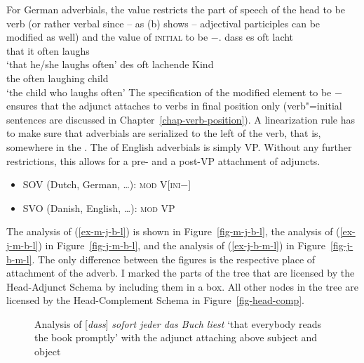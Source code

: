For German adverbials, the value restricts the part of speech of the head to be verb (or rather
verbal since -- as (b) shows -- adjectival participles can be modified as
well) and the value of \textsc{initial} to be $-$. 
\eal
\ex
\gll dass es oft lacht\\
     that it often laughs\\\german
\glt `that he/she laughs often'
\ex 
\gll des oft lachende Kind\\
     the often laughing child\\
\glt `the child who laughs often'
\zl
The specification of the modified element to be \initial$-$ ensures that the adjunct attaches to
verbs in final position only (verb"=initial sentences are discussed in
Chapter~\ref{chap-verb-position}). A linearization rule has to make sure that adverbials are
serialized to the left of the verb, that is, somewhere in the \mf. The \modv of English adverbials
is simply VP. Without any further restrictions, this allows for a pre- and a post-VP attachment of
adjuncts.
\begin{itemize}
\item SOV (Dutch, German, \ldots): \textsc{mod} V[\textsc{ini}$-$]
\item SVO (Danish, English, \ldots): \textsc{mod} VP
\end{itemize}

The analysis of (\ref{ex-m-j-b-l}) is shown in Figure~\vref{fig-m-j-b-l}, the analysis of
(\ref{ex-j-m-b-l}) in Figure~\vref{fig-j-m-b-l}, and the analysis of (\ref{ex-j-b-m-l}) in
Figure~\vref{fig-j-b-m-l}. The only difference between the figures is the respective place of
attachment of the adverb. I marked the parts of the tree that are licensed by the Head-Adjunct
Schema by including them in a box. All other nodes in the tree are licensed by the Head-Complement
Schema in Figure~\ref{fig-head-comp}.


\begin{figure}

\caption{\label{fig-m-j-b-l}Analysis of [\emph{dass}] \emph{sofort jeder das Buch liest} `that everybody reads the
  book promptly' with the adjunct attaching above subject and object}
\end{figure}


